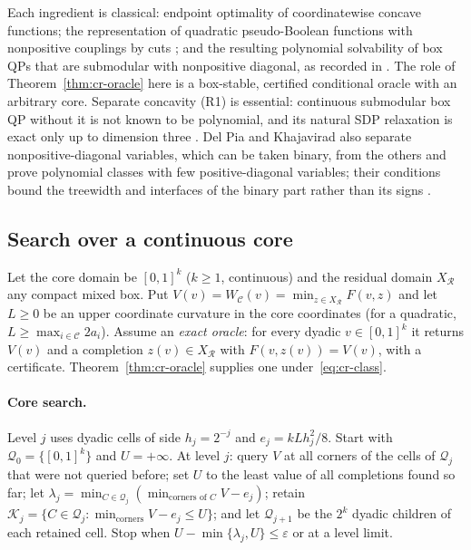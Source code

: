 \begin{remark}\label{rem:cr-cut-prior}
Each ingredient is classical: endpoint optimality of coordinatewise
concave functions; the representation of quadratic pseudo-Boolean
functions with nonpositive couplings by cuts
\cite{Ivanescu1965,PicardRatliff1975,KolmogorovZabih2004}; and the resulting
polynomial solvability of box QPs that are submodular with nonpositive
diagonal, as recorded in \cite{BurerNatarajanWillemsen2026v3}. The role of
Theorem~\ref{thm:cr-oracle} here is a box-stable, certified conditional
oracle with an arbitrary core. Separate concavity (R1) is essential:
continuous submodular box QP without it is not known to be polynomial,
and its natural SDP relaxation is exact only up to dimension three
\cite{BurerNatarajanWillemsen2026v3}. Del Pia and Khajavirad also separate
nonpositive-diagonal variables, which can be taken binary, from the others
and prove polynomial classes with few positive-diagonal variables; their
conditions bound the treewidth and interfaces of the binary part rather
than its signs \cite{DelPiaKhajavirad2026}.
\end{remark}

\subsection{Search over a continuous core}\label{sec:cr-search}

Let the core domain be $[0,1]^k$ ($k\ge1$, continuous) and the residual
domain $X_{\mathcal R}$ any compact mixed box. Put
$V(v)=W_{\mathcal C}(v)=\min_{z\in X_{\mathcal R}}F(v,z)$ and let $L\ge0$ be an
upper coordinate curvature in the core coordinates (for a quadratic,
$L\ge\max_{i\in\mathcal C}2a_i$). Assume an \emph{exact oracle}: for every
dyadic $v\in[0,1]^k$ it returns $V(v)$ and a completion $z(v)\in X_{\mathcal R}$
with $F(v,z(v))=V(v)$, with a certificate. Theorem~\ref{thm:cr-oracle}
supplies one under~\eqref{eq:cr-class}.

\paragraph{Core search.}
Level $j$ uses dyadic cells of side $h_j=2^{-j}$ and
$e_j=kLh_j^2/8$. Start with $\mathcal Q_0=\{[0,1]^k\}$ and $U=+\infty$.
At level $j$: query $V$ at all corners of the cells of $\mathcal Q_j$ that
were not queried before; set $U$ to the least value of all completions
found so far; let
$\lambda_j=\min_{C\in\mathcal Q_j}(\min_{\text{corners of }C}V-e_j)$;
retain $\mathcal K_j=\{C\in\mathcal Q_j:\min_{\text{corners}}V-e_j\le U\}$;
and let $\mathcal Q_{j+1}$ be the $2^k$ dyadic children of each retained
cell. Stop when $U-\min\{\lambda_j,U\}\le\varepsilon$ or at a level limit.

